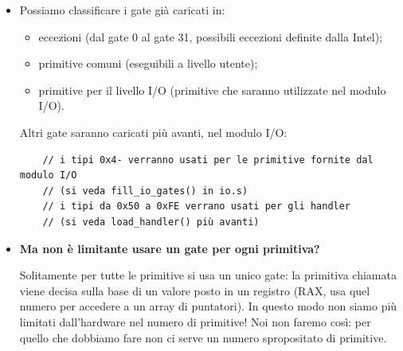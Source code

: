 \documentclass[11pt]{report}
\theoremstyle{definition}
\begin{document}
\begin{itemize}
\begin{multicols}{2}
\begin{verbatim}
		// tipo del driver del timer (priorità  massima)
		#define TIPO_TIMER		0xFF
	\end{verbatim}
\end{multicols}
	\normalsize
	\item Possiamo classificare i gate già caricati in:
	\begin{itemize}
		\item eccezioni (dal gate 0 al gate 31, possibili eccezioni definite dalla Intel);
		\item primitive comuni (eseguibili a livello utente);
		\item primitive per il livello I/O (primitive che saranno utilizzate nel modulo I/O).
	\end{itemize}
	Altri gate saranno caricati più avanti, nel modulo I/O:
	\small 
	\begin{verbatim}
	// i tipi 0x4- verranno usati per le primitive fornite dal modulo I/O
	// (si veda fill_io_gates() in io.s)
	// i tipi da 0x50 a 0xFE verrano usati per gli handler
	// (si veda load_handler() più avanti)
	\end{verbatim}
	\normalsize 
	\item \textbf{Ma non è limitante usare un gate per ogni primitiva?} 
	
	Solitamente per tutte le primitive si usa un unico gate: la primitiva chiamata viene decisa sulla base di un valore posto in un registro (RAX, usa quel numero per accedere a un array di puntatori). In questo modo non siamo più limitati dall'hardware nel numero di primitive! Noi non faremo così: per quello che dobbiamo fare non ci serve un numero spropositato di primitive.
\end{itemize}

\end{document}
